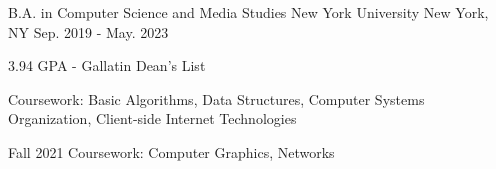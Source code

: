 

\begin{cventries}

  \cventry
    {B.A. in Computer Science and Media Studies} %
    {New York University} %
    {New York, NY} %
    {Sep. 2019 - May. 2023} %
    {
      \begin{cvitems} %
        \item {3.94 GPA - Gallatin Dean's List}
        \item {Coursework: Basic Algorithms, Data Structures, Computer Systems Organization, Client-side Internet Technologies}
        \item {Fall 2021 Coursework: Computer Graphics, Networks}
      \end{cvitems}
    }

\end{cventries}
